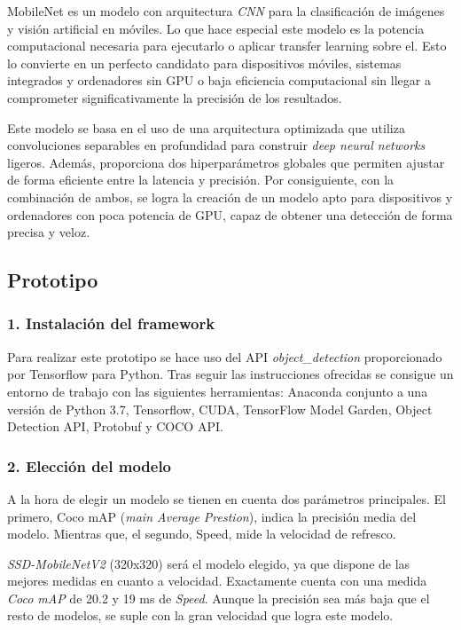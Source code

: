 MobileNet es un modelo con arquitectura \textit{CNN} para la clasificación de imágenes y visión artificial en móviles. Lo que hace especial este modelo es la potencia computacional necesaria para ejecutarlo o aplicar transfer learning sobre el. Esto lo convierte en un perfecto candidato para dispositivos móviles, sistemas integrados y ordenadores sin GPU o baja eficiencia computacional sin llegar a comprometer significativamente la precisión de los resultados.

Este modelo se basa en el uso de una arquitectura optimizada que utiliza convoluciones separables en profundidad para construir \textit{deep neural networks} ligeros. Además, proporciona dos hiperparámetros globales que permiten ajustar de forma eficiente entre la latencia y precisión. Por consiguiente, con la combinación de ambos, se logra la creación de un modelo apto para dispositivos y ordenadores con poca potencia de GPU, capaz de obtener una detección de forma precisa y veloz.

\newpage
\subsection*{Prototipo}

\vspace{-0.5cm}
\subsubsection*{1. Instalación del framework}
\vspace{-0.7cm}
Para realizar este prototipo se hace uso del API \textit{object\_detection} proporcionado por Tensorflow para Python. Tras seguir las instrucciones ofrecidas se consigue un entorno de trabajo con las siguientes herramientas: Anaconda conjunto a una versión de Python 3.7, Tensorflow, CUDA, TensorFlow Model Garden,  Object Detection API, Protobuf y COCO API.

\vspace{-0.5cm}
\subsubsection*{2. Elección del modelo}
\vspace{-0.7cm}
A la hora de elegir un modelo se tienen en cuenta dos parámetros principales. El primero, Coco mAP (\textit{main Average Prestion}), indica la precisión media del modelo. Mientras que, el segundo, Speed, mide la velocidad de refresco.

\textit{SSD-MobileNetV2} (320x320) será el modelo elegido, ya que dispone de las mejores medidas en cuanto a velocidad. Exactamente cuenta con una medida \textit{Coco mAP} de 20.2 y 19 ms de \textit{Speed}. Aunque la precisión sea más baja que el resto de modelos, se suple con la gran velocidad que logra este modelo.

